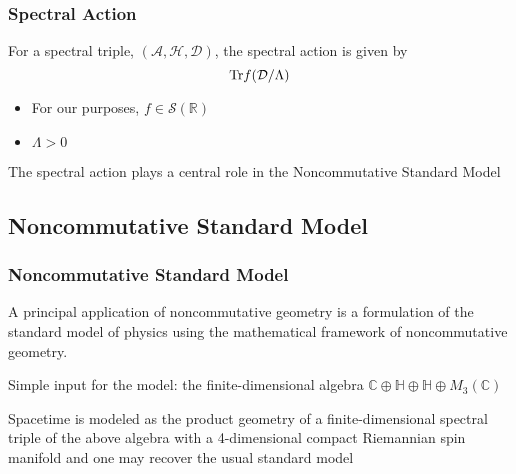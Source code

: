 \documentclass{beamer}
\def\C{{\mathbb C}}
\renewcommand{\H}{{\mathbb H}}
\def\R{{\mathbb R}}
\def\cA{{\mathcal A}}
\def\cD{{\mathcal D}}
\def\cH{{\mathcal H}}
\def\Tr{{\rm Tr}}
\begin{document}
\begin{frame}
	\frametitle{Spectral Action}

	\begin{block}{}
		For a spectral triple, $(\cA, \cH, \cD)$, the spectral action is given by
		\[
		\Tr f(\cD / \Lambda)
		\]
	\end{block}

	\pause

	\begin{itemize}
		\item For our purposes, $f \in \mathcal{S} (\R)$
		\item $\Lambda > 0$
	\end{itemize}

	\pause

	\begin{block}{}
		The spectral action plays a central role in the Noncommutative Standard Model
	\end{block}

\end{frame}


\subsection{Noncommutative Standard Model}

\begin{frame}
	\frametitle{Noncommutative Standard Model}

	\begin{block}{}
		A principal application of noncommutative geometry is a formulation of the standard model of physics using the mathematical framework of noncommutative geometry.
	\end{block}

	\pause

	\begin{block}{}
		Simple input for the model: the finite-dimensional algebra $\C \oplus \H \oplus \H \oplus M_3(\C)$
	\end{block}

	\pause

	\begin{block}{}
		Spacetime is modeled as the product geometry of a finite-dimensional spectral triple of the above algebra with a 4-dimensional compact Riemannian spin manifold and one may recover the usual standard model
	\end{block}

\end{frame}
\end{document}
